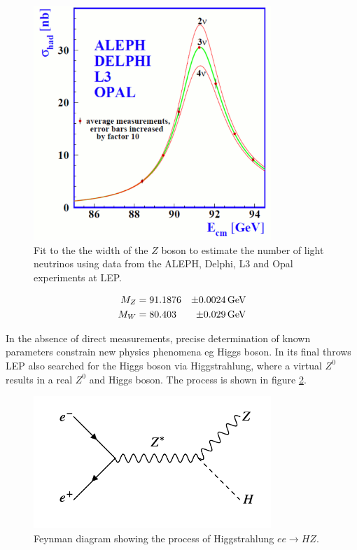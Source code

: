 \begin{figure}[!htb]
  \begin{center}
    \includegraphics[width=0.8\textwidth]{images/chapter_3/zwidth.pdf}
    \caption[Fit to the number of neutrinos using LEP data]{Fit to the the width of the $Z$ boson to estimate the number of light neutrinos using data from the ALEPH, Delphi, L3 and Opal experiments at LEP. \cite{numberOfNeutrinos}}
    \label{fig:ch3_neutrinos}
  \end{center}
\end{figure}

\begin{eqnarray*}
  M_Z & = 91.1876 & \pm 0.0024 \mathrm{\,GeV} \\
  M_W & = 80.403  & \pm 0.029  \mathrm{\,GeV}
\end{eqnarray*}

In the absence of direct measurements, precise determination of known parameters constrain new physics phenomena eg Higgs boson.  In its final throws LEP also searched for the Higgs boson via Higgstrahlung, where a virtual $Z^0$ results in a real $Z^0$ and Higgs boson.  The process is shown in figure \ref{fig:ch3_EEToHZ}.

\begin{figure}[!htb]
  \begin{center}
    \includegraphics[width=0.8\textwidth]{images/web_feynman/image_16.png}
    \caption[Feynman diagram of $ee\to HZ$]{Feynman diagram showing the process of Higgstrahlung $ee\to HZ$.}
    \label{fig:ch3_EEToHZ}
  \end{center}
\end{figure}

